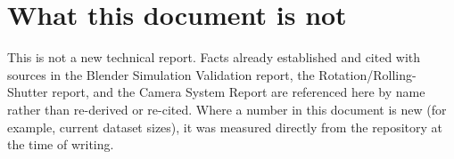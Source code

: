 \section{What this document is not}

This is not a new technical report. Facts already established and cited with sources in the Blender Simulation Validation report, the Rotation/Rolling-Shutter report, and the Camera System Report are referenced here by name rather than re-derived or re-cited. Where a number in this document is new (for example, current dataset sizes), it was measured directly from the repository at the time of writing.
